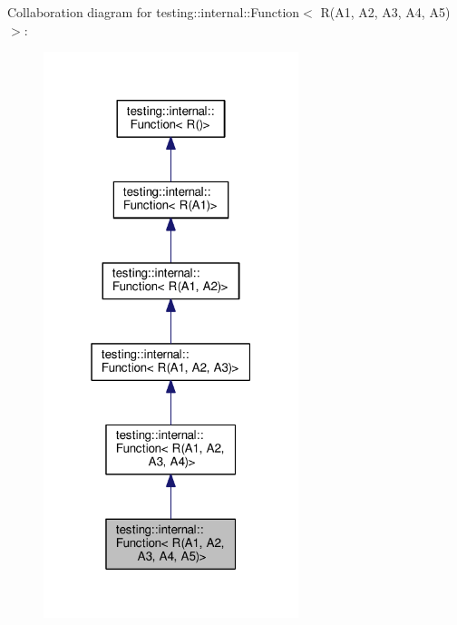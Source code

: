 Collaboration diagram for testing\+:\+:internal\+:\+:Function$<$ R(A1, A2, A3, A4, A5)$>$\+:\nopagebreak
\begin{figure}[H]
\begin{center}
\leavevmode
\includegraphics[width=211pt]{structtesting_1_1internal_1_1Function_3_01R_07A1_00_01A2_00_01A3_00_01A4_00_01A5_08_4__coll__graph}
\end{center}
\end{figure}
